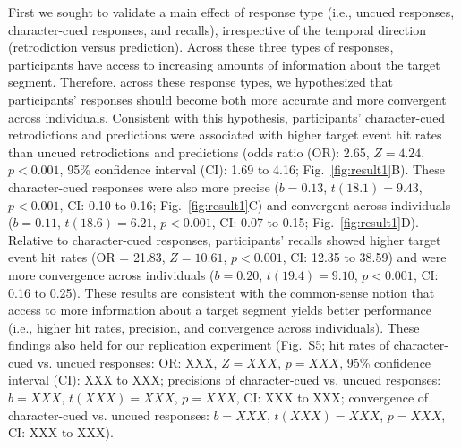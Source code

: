 \documentclass[10pt]{article}
\newcommand{\targetAsymmetries}{S5}
\begin{document}
First we sought to validate a main effect of response type (i.e., uncued
responses, character-cued responses, and recalls), irrespective of the temporal
direction (retrodiction versus prediction). Across these three types of
responses, participants have access to increasing amounts of information about
the target segment. Therefore, across these response types, we hypothesized
that participants' responses should become both more accurate and more
convergent across individuals. Consistent with this hypothesis, participants'
character-cued retrodictions and predictions were associated with higher target
event hit rates than uncued retrodictions and predictions (odds ratio (OR):
2.65, $Z = 4.24$, $p < 0.001$, 95\% confidence interval (CI): 1.69 to 4.16;
Fig.~\ref{fig:result1}B). These character-cued responses were also more precise
($b = 0.13$, $t(18.1) = 9.43$, $p < 0.001$, CI: 0.10 to 0.16;
Fig.~\ref{fig:result1}C) and convergent across individuals ($b = 0.11$,
$t(18.6) = 6.21$, $p < 0.001$, CI: 0.07 to 0.15; Fig.~\ref{fig:result1}D).
Relative to character-cued responses, participants' recalls showed higher
target event hit rates (OR = 21.83, $Z = 10.61$, $p < 0.001$, CI: 12.35 to
38.59) and were more convergence across individuals ($b = 0.20$, $t(19.4) =
9.10$, $p < 0.001$, CI: 0.16 to 0.25). These results are consistent with the
common-sense notion that access to more information about a target segment
yields better performance (i.e., higher hit rates, precision, and convergence
across individuals). These findings also held for our replication experiment
(Fig.~\targetAsymmetries; hit rates of character-cued vs. uncued responses: OR:
XXX, $Z = XXX$, $p = XXX$, 95\% confidence interval (CI): XXX to XXX;
precisions of character-cued vs. uncued responses: $b = XXX$, $t(XXX) = XXX$,
$p = XXX$, CI: XXX to XXX; convergence of character-cued vs. uncued responses:
$b = XXX$, $t(XXX) = XXX$, $p = XXX$, CI: XXX to XXX).
\end{document}
